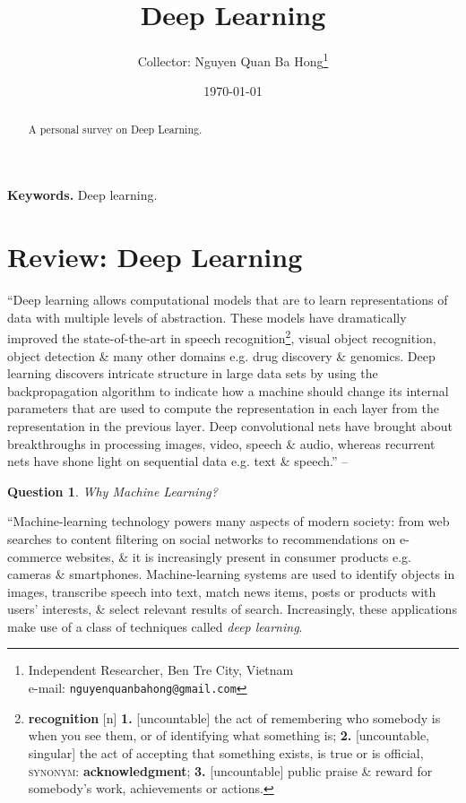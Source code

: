 \documentclass{article}
\title{Deep Learning}
\author{Collector: Nguyen Quan Ba Hong\footnote{Independent Researcher, Ben Tre City, Vietnam\\e-mail: \texttt{nguyenquanbahong@gmail.com}}}
\date{\today}
\numberwithin{equation}{section}
\newtheorem{question}{Question}[section]
\begin{document}
\maketitle
\begin{abstract}
	A personal survey on Deep Learning.
\end{abstract}

\textbf{Keywords.} Deep learning.
\tableofcontents


\section{Review: Deep Learning}
``Deep learning allows computational models that are  to learn representations of data with multiple levels of abstraction. These models have dramatically improved the state-of-the-art in speech recognition\footnote{\textbf{recognition} [n] \textbf{1.} [uncountable] the act of remembering who somebody is when you see them, or of identifying what something is; \textbf{2.} [uncountable, singular] the act of accepting that something exists, is true or is official, \textsc{synonym}: \textbf{acknowledgment}; \textbf{3.} [uncountable] public praise \& reward for somebody's work, achievements or actions.}, visual object recognition, object detection \& many other domains e.g. drug discovery \& genomics. Deep learning discovers intricate structure in large data sets by using the backpropagation algorithm to indicate how a machine should change its internal parameters that are used to compute the representation in each layer from the representation in the previous layer. Deep convolutional nets have brought about breakthroughs in processing images, video, speech \& audio, whereas recurrent nets have shone light on sequential data e.g. text \& speech.'' -- \cite[Abstract, p. 436]{LeCun_Bengio_Hinton2015}

\begin{question}
	Why Machine Learning?
\end{question}
``Machine-learning technology powers many aspects of modern society: from web searches to content filtering on social networks to recommendations on e-commerce websites, \& it is increasingly present in consumer products e.g. cameras \& smartphones. Machine-learning systems are used to identify objects in images, transcribe speech into text, match news items, posts or products with users' interests, \& select relevant results of search. Increasingly, these applications make use of a class of techniques called \textit{deep learning}.
\end{document}
